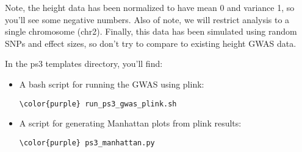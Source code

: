 \documentclass[12pt]{article}
\begin{document}
Note, the height data has been normalized to have mean 0 and variance 1, so you'll see some negative numbers. Also of note, we will restrict analysis to a single chromosome (chr2). Finally, this data has been simulated using random SNPs and effect sizes, so don't try to compare to existing height GWAS data.
	
In the ps3 templates directory, you'll find:

\begin{itemize}
\item A bash script for running the GWAS using plink:
\begin{Verbatim}[commandchars=\\\{\}]
\color{purple} run_ps3_gwas_plink.sh
\end{Verbatim}

\item A script for generating Manhattan plots from plink results:
\begin{Verbatim}[commandchars=\\\{\}]
\color{purple} ps3_manhattan.py
\end{Verbatim}
\end{itemize}

\end{document}
